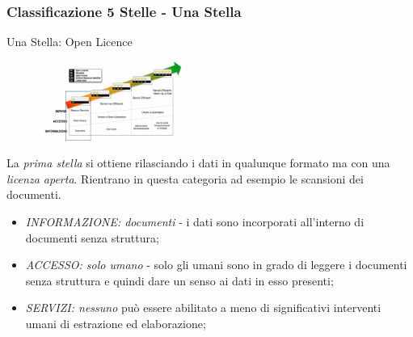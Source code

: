 \documentclass[8pt]{beamer}
\begin{document}
  
\begin{frame}
  \frametitle{Classificazione 5 Stelle - Una Stella}
  
  Una Stella: Open Licence
  
  \begin{figure}
     \includegraphics[width=180px]{stella1.png} 
  \end{figure}
  
  La \emph{prima stella} si ottiene rilasciando i dati in qualunque formato
  ma con una \emph{licenza aperta}.
  Rientrano in questa categoria ad esempio le scansioni dei documenti.
  \vspace{\baselineskip}

  \begin{itemize}[<+->]
   \item \emph{INFORMAZIONE: documenti} - i dati sono incorporati all’interno di documenti senza struttura;
   \item \emph{ACCESSO: solo umano} - solo gli umani sono in grado di leggere i documenti senza struttura 
   e quindi dare un senso ai dati in esso presenti;
   \item \emph{SERVIZI: nessuno} può essere abilitato a meno di significativi interventi umani 
   di estrazione ed elaborazione;
  \end{itemize}
\end{frame}
\end{document}

